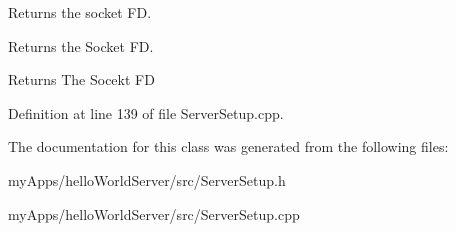 Returns the socket FD. 

Returns the Socket FD.

\begin{DoxyReturn}{Returns}
The Socekt FD 
\end{DoxyReturn}


Definition at line 139 of file Server\+Setup.\+cpp.



The documentation for this class was generated from the following files\+:\begin{DoxyCompactItemize}
\item 
my\+Apps/hello\+World\+Server/src/Server\+Setup.\+h\item 
my\+Apps/hello\+World\+Server/src/Server\+Setup.\+cpp\end{DoxyCompactItemize}
